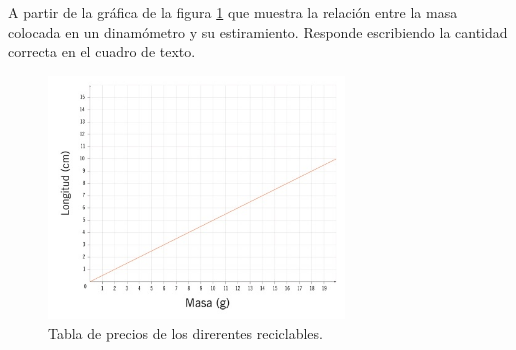 \question[10] A partir de la gráfica de la figura \ref{fig:SINMAT1_U3_AC75_IMG1} que muestra la relación entre la masa colocada en un dinamómetro y su estiramiento. Responde escribiendo la cantidad correcta en el cuadro de texto.
\begin{figure}[H]
    \centering
    \includegraphics[width=0.7\textwidth]{../images/SINMAT1_U3_AC75_IMG1.jpg}
    \caption{Tabla de precios de los direrentes reciclables.}
    \label{fig:SINMAT1_U3_AC75_IMG1}
\end{figure}
\begin{parts}
    
    
    
    
    

\end{parts}